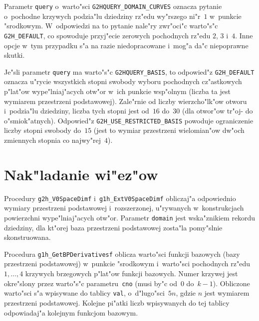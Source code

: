 Parametr \texttt{query} o~warto"sci \texttt{G2HQUERY\_DOMAIN\_CURVES} oznacza
pytanie o~pochodne krzywych podzia"lu dziedziny rz"edu wy"rszego ni"r~$1$
w~punkcie "srodkowym. W~odpowiedzi na to pytanie nale"ry zwr"oci"c
warto"s"c \texttt{G2H\_DEFAULT}, co spowoduje przyj"ecie zerowych pochodnych
rz"edu $2$, $3$ i~$4$. Inne opcje w~tym przypadku s"a na razie niedopracowane
i~mog"a da"c niepoprawne skutki.

Je"sli parametr \texttt{query} ma warto"s"c \texttt{G2HQUERY\_BASIS}, to
odpowied"z \texttt{G2H\_DEFAULT} oznacza u"rycie wszystkich stopni swobody
wyboru pochodnych cz"astkowych p"lat"ow wype"lniaj"acych otw"or w~ich punkcie
wsp"olnym (liczba ta jest wymiarem przestrzeni podstawowej). Zale"rnie od
liczby wierzcho"lk"ow otworu i~podzia"lu dziedziny, liczba tych stopni jest
od~$16$ do~$30$ (dla otwor"ow tr"oj- do o"smiok"atnych). Odpowied"z
\texttt{G2H\_USE\_RESTRICTED\_BASIS} powoduje ograniczenie liczby stopni
swobody do~$15$ (jest to wymiar przestrzeni wielomian"ow dw"och zmiennych
stopnia co najwy"rej~$4$).


\section{\label{sect:g2h:constraints}Nak"ladanie wi"ez"ow}

\begin{sloppypar}
\hspace*{\parindent}Procedury \texttt{g2h\_V0SpaceDimf}
i~\texttt{g1h\_ExtV0SpaceDimf} obliczaj"a
odpowiednio wymiary przestrzeni podstawowej i~rozszerzonej, u"rywanych
w~konstrukcjach po\-wierzch\-ni wype"lniaj"acych otw"or. Parametr \texttt{domain}
jest wska"znikiem rekordu dziedziny, dla kt"orej baza przestrzeni podstawowej
zosta"la pomy"slnie skonstruowana.%
\end{sloppypar}

\vspace{\bigskipamount}
\begin{sloppypar}
Procedura \texttt{g1h\_GetBPDerivativesf} oblicza warto"sci funkcji
bazowych (bazy przestrzeni podstawowej) w~punkcie "srodkowym
i~warto"sci pochodnych rz"edu $1,\ldots,4$
krzywych brzegowych p"lat"ow funkcji bazowych. Numer krzywej jest okre"slony
przez warto"s"c parametru~\texttt{cno} (musi by"c od~$0$ do~$k-1$).
Obliczone warto"sci s"a wpisywane do tablicy \texttt{val}, o~d"lugo"sci~$5n$,
gdzie $n$ jest wymiarem przestrzeni podstawowej. Kolejne pi"atki liczb
wpisywanych do tej tablicy odpowiadaj"a kolejnym funkcjom bazowym.%
\end{sloppypar}

